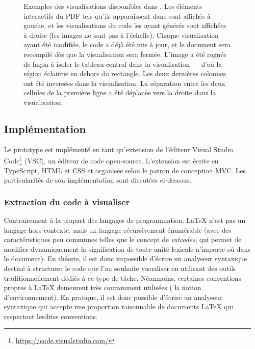 \begin{figure*}[h]
  \caption{Exemples des visualisations disponibles dans \iLaTeX{}.
  Les éléments interactifs du PDF tels qu'ils apparaissent dans \iLaTeX{} sont affichés à gauche, et les visualisations du code les ayant générés sont affichées à droite (les images ne sont pas à l'échelle).
  Chaque visualisation ayant été modifiée, le code a déjà été mis à jour, et le document sera recompilé dès que la visualisation sera fermée. 
   L'image a été rognée de façon à isoler le tableau central dans la visualisation --- d'où la région éclaircie en dehors du rectangle.
   Les deux dernières colonnes ont été inversées dans la visualisation.
   La séparation entre les deux cellules de la première ligne a été déplacée vers la droite dans la visualisation.}
  \label{fig:ilatex-visualisations}
\end{figure*}



\subsection{Implémentation}
Le prototype est implémenté en tant qu'extension de l'éditeur Visual Studio Code\footnote{\url{https://code.visualstudio.com/}} (VSC), un éditeur de code open-source.
L'extension est écrite en TypeScript, HTML et CSS et organisée selon le patron de conception MVC.
Les particularités de son implémentation sont discutées ci-dessous.


\subsubsection{Extraction du code à visualiser}
Contrairement à la plupart des langages de programmation, \LaTeX{} n'est pas un langage hors-contexte, mais un langage récursivement énumérable (avec des caractéristiques peu communes telles que le concept de \emph{catcodes}, qui permet de modifier dynamiquement la signification de toute unité lexicale n'importe où dans le document).
En théorie, il est donc impossible d'écrire un analyseur syntaxique destiné à structurer le code que l'on souhaite visualiser en utilisant des outils traditionnellement dédiés à ce type de tâche.
Néanmoins, certaines conventions propres à \LaTeX{} demeurent très couramment utilisées (\eg{} la notion d'environnement).
En pratique, il est donc possible d'écrire un analyseur syntaxique qui accepte une proportion raisonnable de documents \LaTeX{} qui respectent lesdites conventions.


